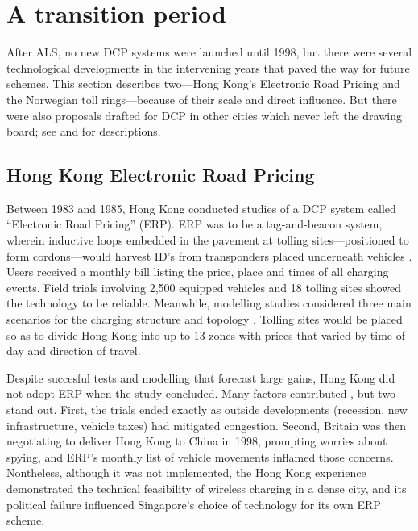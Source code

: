 \section{A transition period}

After ALS, no new DCP systems were launched until 1998, but there were several technological developments in the intervening years that paved the way for future schemes. This section describes two---Hong Kong's Electronic Road Pricing and the Norwegian toll rings---because of their scale and direct influence. But there were also  proposals drafted for DCP in other cities which never left the drawing board; see \citet{Gomez-Ibanez1994} and \citet{Small1998} for descriptions.

\subsection{Hong Kong Electronic Road Pricing}

 Between 1983 and 1985, Hong Kong conducted studies of a DCP system called ``Electronic Road Pricing'' (ERP). ERP was to be a tag-and-beacon system, wherein inductive loops embedded in the pavement at tolling sites---positioned to form cordons---would harvest ID's from transponders placed underneath vehicles \citep{Dawson1986}. Users received a monthly bill listing the price, place and times of all charging events. Field trials involving 2,500 equipped vehicles and 18 tolling sites showed the technology to be reliable. Meanwhile, modelling studies considered three main scenarios for the charging structure and topology \citep[Table 11, p. 23]{Gomez-Ibanez1994}. Tolling sites would be placed so as to divide Hong Kong into up to 13 zones with prices that varied by time-of-day and direction of travel. 

 Despite succesful tests and modelling that forecast large gains, Hong Kong did not adopt ERP when the study concluded. Many factors contributed \citep{Hau1990,Borins1988}, but two stand out. First, the trials ended exactly as outside developments (recession, new infrastructure, vehicle taxes) had mitigated congestion. Second, Britain was then negotiating to deliver Hong Kong to China in 1998, prompting worries about spying, and  ERP's monthly list of vehicle movements inflamed those concerns. Nontheless, although it was not implemented, the Hong Kong experience demonstrated the technical feasibility of wireless charging in a dense city, and its political failure influenced Singapore's choice of technology for its own ERP scheme.
 
